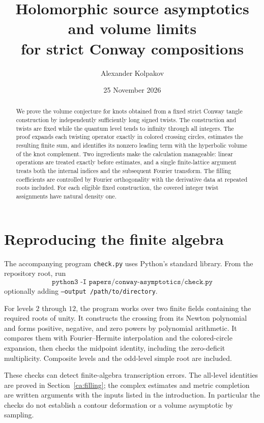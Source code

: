 \documentclass[11pt]{article}
\title{Holomorphic source asymptotics and volume limits\\for strict Conway compositions}
\author{Alexander Kolpakov}\date{25 November 2026}
\numberwithin{equation}{section}
\begin{document}
\maketitle
\begin{abstract}
We prove the volume conjecture for knots obtained from a fixed strict
Conway tangle construction by independently sufficiently long signed
twists. The construction and twists are fixed while the quantum level
tends to infinity through all integers. The proof expands each twisting
operator exactly in colored crossing circles, estimates the resulting
finite sum, and identifies its nonzero leading term with the hyperbolic
volume of the knot complement. Two ingredients make the calculation
manageable: linear operations are treated exactly before estimates,
and a single finite-lattice argument
treats both the internal indices and the subsequent Fourier transform.
The filling coefficients are controlled by Fourier orthogonality with
the derivative data at repeated roots included. For each eligible fixed
construction, the covered integer twist assignments have natural density
one.
\end{abstract}








\section{Reproducing the finite algebra}\label{ca:reproduction}
The accompanying program \texttt{check.py} uses Python's standard library.
From the repository root, run
\[
 \texttt{python3 -I papers/conway-asymptotics/check.py}
\]
optionally adding \texttt{--output /path/to/directory}.

For levels $2$ through $12$, the program works over two finite fields
containing the required roots of unity. It constructs the crossing from
its Newton polynomial and forms positive, negative, and zero powers by
polynomial arithmetic. It compares them with Fourier--Hermite
interpolation and the colored-circle expansion, then checks the midpoint
identity, including the zero-deficit multiplicity. Composite levels and
the odd-level simple root are included.

These checks can detect finite-algebra transcription errors. The
all-level identities are proved in Section~\ref{ca:filling}; the
complex estimates and metric completion are written arguments with
the inputs listed in the introduction. In particular the checks do
not establish a contour deformation or a volume asymptotic by sampling.
\end{document}
